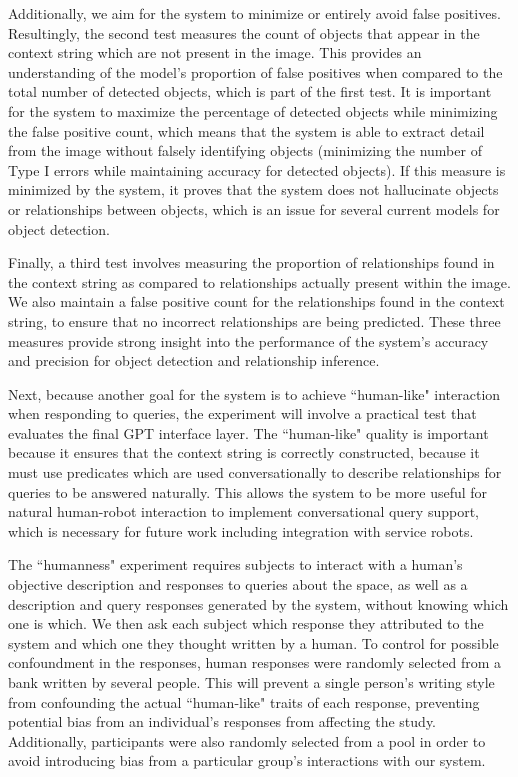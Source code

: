 \documentclass[letterpaper, 10 pt, conference]{ieeeconf}  %
\begin{document}
    Additionally, we aim for the system to minimize or entirely avoid false positives. Resultingly, the second test measures the count of objects that appear in the context string which are not present in the image. This provides an understanding of the model's proportion of false positives when compared to the total number of detected objects, which is part of the first test. It is important for the system to maximize the percentage of detected objects while minimizing the false positive count, which means that the system is able to extract detail from the image without falsely identifying objects (minimizing the number of Type I errors while maintaining accuracy for detected objects). If this measure is minimized by the system, it proves that the system does not hallucinate objects or relationships between objects, which is an issue for several current models for object detection.
    
    Finally, a third test involves measuring the proportion of relationships found in the context string as compared to relationships actually present within the image. We also maintain a false positive count for the relationships found in the context string, to ensure that no incorrect relationships are being predicted. These three measures provide strong insight into the performance of the system's accuracy and precision for object detection and relationship inference.

    Next, because another goal for the system is to achieve ``human-like" interaction when responding to queries, the experiment will involve a practical test that evaluates the final GPT interface layer. The ``human-like" quality is important because it ensures that the context string is correctly constructed, because it must use predicates which are used conversationally to describe relationships for queries to be answered naturally. This allows the system to be more useful for natural human-robot interaction to implement conversational query support, which is necessary for future work including integration with service robots.
    
    The ``humanness" experiment requires subjects to interact with a human's objective description and responses to queries about the space, as well as a description and query responses generated by the system, without knowing which one is which. We then ask each subject which response they attributed to the system and which one they thought written by a human. To control for possible confoundment in the responses, human responses were randomly selected from a bank written by several people. This will prevent a single person's writing style from confounding the actual ``human-like" traits of each response, preventing potential bias from an individual's responses from affecting the study. Additionally, participants were also randomly selected from a pool in order to avoid introducing bias from a particular group's interactions with our system.
    
\end{document}
